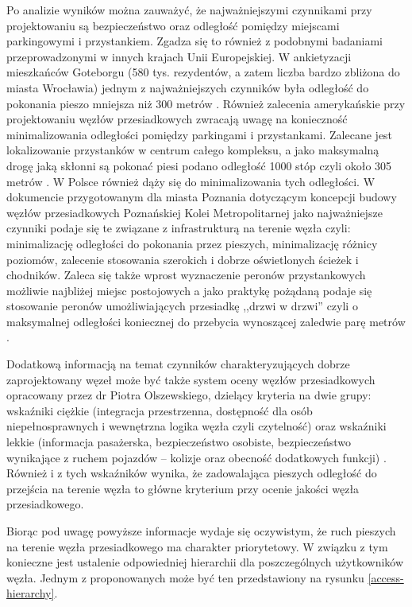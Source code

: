 \documentclass[twoside,12pt]{article}
\begin{document}
	Po analizie wyników można zauważyć, że najważniejszymi czynnikami przy projektowaniu są bezpieczeństwo oraz odległość pomiędzy miejscami parkingowymi i przystankiem. Zgadza się to również z podobnymi badaniami przeprowadzonymi w innych krajach Unii Europejskiej. W ankietyzacji mieszkańców Goteborgu (580 tys. rezydentów, a zatem liczba bardzo zbliżona do miasta Wrocławia) jednym z najważniejszych czynników była odległość do pokonania pieszo mniejsza niż 300 metrów \cite{gothenburg}. Również zalecenia amerykańskie przy projektowaniu węzłów przesiadkowych zwracają uwagę na konieczność minimalizowania odległości pomiędzy parkingami i przystankami. Zalecane jest lokalizowanie przystanków w centrum całego kompleksu, a jako maksymalną drogę jaką skłonni są pokonać piesi podano odległość 1000 stóp czyli około 305 metrów \cite{florida}. W Polsce również dąży się do minimalizowania tych odległości. W dokumencie przygotowanym dla miasta Poznania dotyczącym koncepcji budowy węzłów przesiadkowych Poznańskiej Kolei Metropolitarnej jako najważniejsze czynniki podaje się te związane z infrastrukturą na terenie węzła czyli: minimalizację odległości do pokonania przez pieszych, minimalizację różnicy poziomów, zalecenie stosowania szerokich i dobrze oświetlonych ścieżek i chodników. Zaleca się także wprost wyznaczenie peronów przystankowych możliwie najbliżej miejsc postojowych a jako praktykę pożądaną podaje się stosowanie peronów umożliwiających przesiadkę ,,drzwi w drzwi'' czyli o maksymalnej odległości koniecznej do przebycia wynoszącej zaledwie parę metrów \cite{poznan}.
	
	Dodatkową informacją na temat czynników charakteryzujących dobrze zaprojektowany węzeł może być także system oceny węzłów przesiadkowych opracowany przez dr Piotra Olszewskiego, dzielący kryteria na dwie grupy: wskaźniki ciężkie (integracja przestrzenna, dostępność dla osób niepełnosprawnych i wewnętrzna logika węzła czyli czytelność) oraz wskaźniki lekkie (informacja pasażerska, bezpieczeństwo osobiste, bezpieczeństwo wynikające z ruchem pojazdów -- kolizje oraz obecność dodatkowych funkcji) \cite{raport-vip}. Również i z tych wskaźników wynika, że zadowalająca pieszych odległość do przejścia na terenie węzła to główne kryterium przy ocenie jakości węzła przesiadkowego. 
	
	Biorąc pod uwagę powyższe informacje wydaje się oczywistym, że ruch pieszych na terenie węzła przesiadkowego ma charakter priorytetowy. W związku z tym konieczne jest ustalenie odpowiedniej hierarchii dla poszczególnych użytkowników węzła. Jednym z proponowanych może być ten przedstawiony na rysunku \ref{access-hierarchy}.
	
\end{document}
